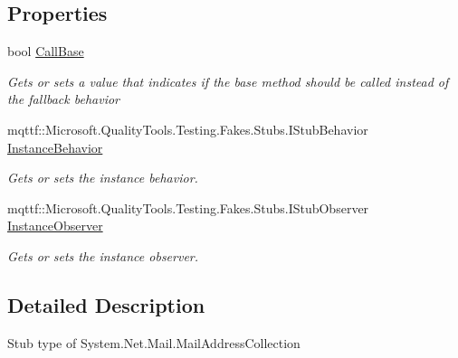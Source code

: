 \subsection*{Properties}
\begin{DoxyCompactItemize}
\item 
bool \hyperlink{class_system_1_1_net_1_1_mail_1_1_fakes_1_1_stub_mail_address_collection_a344d6ab27dc18f4180a579e27e3bce0a}{Call\-Base}
\begin{DoxyCompactList}\small\item\em Gets or sets a value that indicates if the base method should be called instead of the fallback behavior\end{DoxyCompactList}\item 
mqttf\-::\-Microsoft.\-Quality\-Tools.\-Testing.\-Fakes.\-Stubs.\-I\-Stub\-Behavior \hyperlink{class_system_1_1_net_1_1_mail_1_1_fakes_1_1_stub_mail_address_collection_ac1a39bb6a2d84f2f9d1eeb3f73df9623}{Instance\-Behavior}
\begin{DoxyCompactList}\small\item\em Gets or sets the instance behavior.\end{DoxyCompactList}\item 
mqttf\-::\-Microsoft.\-Quality\-Tools.\-Testing.\-Fakes.\-Stubs.\-I\-Stub\-Observer \hyperlink{class_system_1_1_net_1_1_mail_1_1_fakes_1_1_stub_mail_address_collection_a2e86fd81bae133d673cc6e40630a497d}{Instance\-Observer}
\begin{DoxyCompactList}\small\item\em Gets or sets the instance observer.\end{DoxyCompactList}\end{DoxyCompactItemize}


\subsection{Detailed Description}
Stub type of System.\-Net.\-Mail.\-Mail\-Address\-Collection



